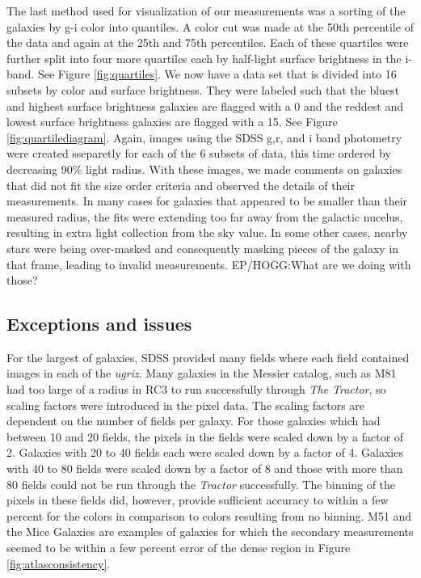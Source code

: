 \documentclass[12pt,preprint,pdftex]{aastex}
\begin{document}
The last method used for visualization of our measurements was a
sorting of the galaxies by g-i color into quantiles. A color cut was
made at the 50th percentile of the data and again at the 25th and 75th
percentiles. Each of these quartiles were further split into four more
quartiles each by half-light surface brightness in the i-band. See
Figure \ref{fig:quartiles}. We now have a data set that is divided
into 16 subsets by color and surface brightness. They were labeled
such that the bluest and highest surface brightness galaxies are
flagged with a 0 and the reddest and lowest surface brightness
galaxies are flagged with a 15. See Figure
\ref{fig:quartilediagram}. Again, images using the SDSS g,r, and i
band photometry were created sseparetly for each of the 6 subsets of
data, this time ordered by decreasing 90\% light radius. With these
images, we made comments on galaxies that did not fit the size order
criteria and observed the details of their measurements. In many cases
for galaxies that appeared to be smaller than their measured radius,
the fits were extending too far away from the galactic nucelus,
resulting in extra light collection from the sky value. In some other
cases, nearby stars were being over-masked and consequently masking
pieces of the galaxy in that frame, leading to invalid
measurements. EP/HOGG:What are we doing with those?

\subsection{Exceptions and issues}\label{sec:results}
For the largest of galaxies, SDSS provided many fields where each
field contained images in each of the \textit{ugriz}. Many galaxies in
the Messier catalog, such as M81 had too large of a radius in RC3 to
run successfully through \emph{The Tractor}, so scaling factors were
introduced in the pixel data. The scaling factors are dependent on the
number of fields per galaxy. For those galaxies which had between 10
and 20 fields, the pixels in the fields were scaled down by a factor
of 2. Galaxies with 20 to 40 fields each were scaled down by a factor
of 4. Galaxies with 40 to 80 fields were scaled down by a factor of 8
and those with more than 80 fields could not be run through the
\textit{Tractor} successfully. The binning of the pixels in these fields
did, however, provide sufficient accuracy to within a few percent for
the colors in comparison to colors resulting from no binning.
 M51 and the Mice Galaxies are examples of galaxies for which the
 secondary measurements seemed to be within a few percent error of the
 dense region in Figure \ref{fig:atlasconsistency}.
\end{document}
